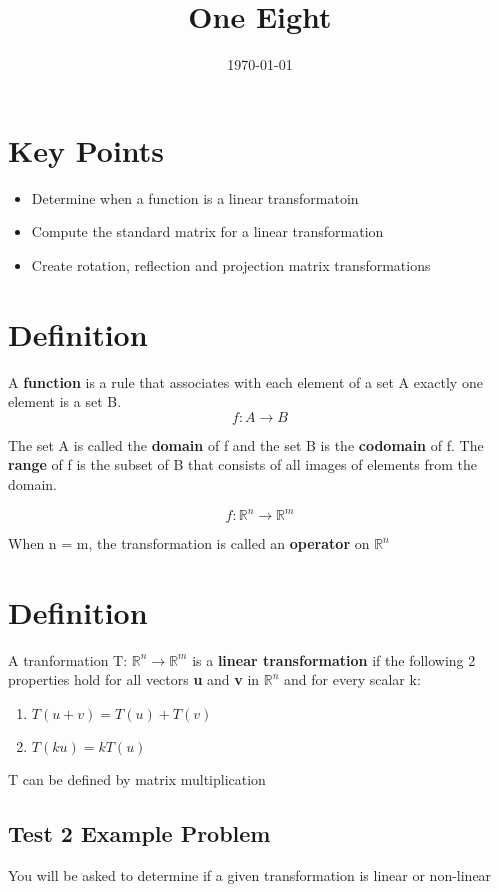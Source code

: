 \documentclass[11pt]{article}
\date{\today}
\title{One Eight}
\begin{document}
\maketitle
\tableofcontents

\section{Key Points}
\label{sec:org663bddb}
\begin{itemize}
\item Determine when a function is a linear transformatoin
\item Compute the standard matrix for a linear transformation
\item Create rotation, reflection and projection matrix transformations
\end{itemize}
\section{Definition}
\label{sec:orgf7268b3}
A \textbf{function} is a rule that associates with each element of a set A exactly one element is a set B.
\[
f: A \rightarrow{} B
\]

The set A is called the \textbf{domain} of f and the set B is the \textbf{codomain} of f. The \textbf{range} of f is the subset of B that consists of all images of elements from the domain.

\[
f: \mathbb{R}^{n} \rightarrow{} \mathbb{R}^{m}
\]

When n = m, the transformation is called an \textbf{operator} on \(\mathbb{R}^{n}\)
\section{Definition}
\label{sec:org3610f1e}
A tranformation T: \(\mathbb{R}^{n} \rightarrow{} \mathbb{R}^{m}\) is a \textbf{linear transformation} if the following 2 properties hold for all vectors \textbf{u} and \textbf{v} in \(\mathbb{R}^{n}\) and for every scalar k:

\begin{enumerate}
\item \(T(u+v) = T(u) + T(v)\)
\item \(T(ku) = kT(u)\)
\end{enumerate}

T can be defined by matrix multiplication
\subsection{Test 2 Example Problem}
\label{sec:orgca91516}
You will be asked to determine if a given transformation is linear or non-linear
\end{document}
